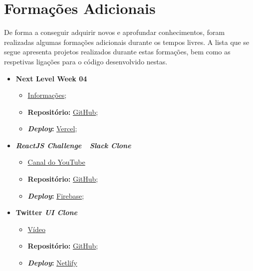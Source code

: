 \section{Formações Adicionais}

De forma a conseguir adquirir novos e aprofundar conhecimentos, foram realizadas algumas formações adicionais durante os tempos livres. A lista que se segue apresenta projetos realizados durante estas formações, bem como as respetivas ligações para o código desenvolvido nestas.

\clearpage

\begin{minipage}[t]{0.45\textwidth}
	\begin{itemize}
		\item \textbf{Next Level Week 04}
			\begin{itemize}
				\item \href{http://nextlevelweek.com/}{Informações};
				\item \textbf{Repositório:} \href{https://github.com/TutoDS/nlw04-react}{GitHub};
				\item \textbf{\textit{Deploy}:} \href{https://move-it-tutods.vercel.app}{Vercel};
			\end{itemize}

		\item \textbf{\textit{ReactJS Challenge~\textemdash~Slack Clone}}
			\begin{itemize}
				\item \href{https://www.youtube.com/channel/UCqrILQNl5Ed9Dz6CGMyvMTQ}{Canal do YouTube}
				\item \textbf{Repositório:} \href{https://github.com/TutoDS/reactjs-slack-clone-challenge}{GitHub};
				\item \textbf{\textit{Deploy}:} \href{https://slack-clone-challenge-c35ca.web.app/}{Firebase};
			\end{itemize}

			\item \textbf{Twitter \textit{UI Clone}}
			\begin{itemize}
				\item \href{https://www.youtube.com/watch?v=K-8z_4xvT3o}{Vídeo}
				\item \textbf{Repositório:} \href{https://github.com/TutoDS/twitter-ui-clone}{GitHub};
				\item \textbf{\textit{Deploy}:} \href{https://twitter-clone-tutods.netlify.app/}{Netlify}
			\end{itemize}
	\end{itemize}
\end{minipage}
